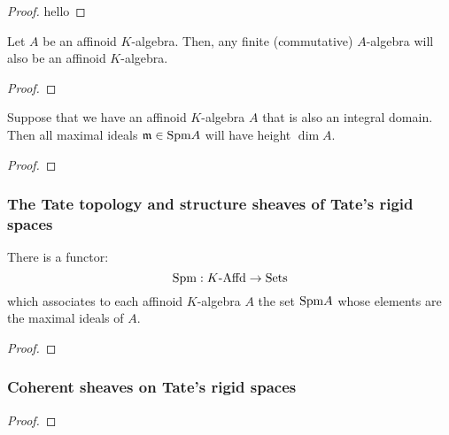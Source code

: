                 \begin{proof}
                    hello
                \end{proof}
            \begin{corollary}
                Let $A$ be an affinoid $K$-algebra. Then, any finite (commutative) $A$-algebra will also be an affinoid $K$-algebra. 
            \end{corollary}
                \begin{proof}
                    
                \end{proof}
            \begin{corollary}
                Suppose that we have an affinoid $K$-algebra $A$ that is also an integral domain. Then all maximal ideals $\mathfrak{m} \in \mathrm{Spm} A$ will have height $\dim A$.
            \end{corollary}
                \begin{proof}
                    
                \end{proof}
        
        \subsubsection{The Tate topology and structure sheaves of Tate's rigid spaces}
            \begin{proposition} \label{prop: maximal_spectra_of_affinoid_algebras}
                There is a functor:
                    $$\mathrm{Spm}: K\text{-}\mathrm{Affd} \to \mathrm{Sets}$$
                which associates to each affinoid $K$-algebra $A$ the set $\mathrm{Spm} A$ whose elements are the maximal ideals of $A$. 
            \end{proposition}
                \begin{proof}
                    
                \end{proof}
            \begin{definition} \label{def: the_canonical_topology_for_affinoid_algebras}
                
            \end{definition}
        
        \subsubsection{Coherent sheaves on Tate's rigid spaces}
            \begin{theorem} \label{theorem: tate_acyclicity_theorem_for_rigid_spaces}
                
            \end{theorem}
                \begin{proof}
                    
                \end{proof}
    
